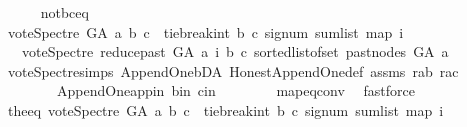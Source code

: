 \begin{isabellebody}
\isanewline
\ \ \ \ \isamarkupfalse%
\ not{\isacharunderscore}{\kern0pt}b{\isacharunderscore}{\kern0pt}c{\isacharunderscore}{\kern0pt}eq\isanewline
\ \ \ \ \isamarkupfalse%
\ \isamarkupfalse%
\ {\isachardoublequoteopen}vote{\isacharunderscore}{\kern0pt}Spectre\ G{\isacharunderscore}{\kern0pt}A\ a\ b\ c\ {\isacharequal}{\kern0pt}\ {\isacharparenleft}{\kern0pt}tie{\isacharunderscore}{\kern0pt}break{\isacharunderscore}{\kern0pt}int\ b\ c\ {\isacharparenleft}{\kern0pt}signum\ {\isacharparenleft}{\kern0pt}sum{\isacharunderscore}{\kern0pt}list\ {\isacharparenleft}{\kern0pt}map\ {\isacharparenleft}{\kern0pt}{\isasymlambda}i{\isachardot}{\kern0pt}\isanewline
\ \ \ {\isacharparenleft}{\kern0pt}vote{\isacharunderscore}{\kern0pt}Spectre\ {\isacharparenleft}{\kern0pt}reduce{\isacharunderscore}{\kern0pt}past\ G{\isacharunderscore}{\kern0pt}A\ a{\isacharparenright}{\kern0pt}\ i\ b\ c{\isacharparenright}{\kern0pt}{\isacharparenright}{\kern0pt}\ {\isacharparenleft}{\kern0pt}sorted{\isacharunderscore}{\kern0pt}list{\isacharunderscore}{\kern0pt}of{\isacharunderscore}{\kern0pt}set\ {\isacharparenleft}{\kern0pt}past{\isacharunderscore}{\kern0pt}nodes\ G{\isacharunderscore}{\kern0pt}A\ a{\isacharparenright}{\kern0pt}{\isacharparenright}{\kern0pt}{\isacharparenright}{\kern0pt}{\isacharparenright}{\kern0pt}{\isacharparenright}{\kern0pt}{\isacharparenright}{\kern0pt}{\isachardoublequoteclose}\isanewline
\ \ \ \ \ \ \isamarkupfalse%
\ vote{\isacharunderscore}{\kern0pt}Spectre{\isachardot}{\kern0pt}simps\ Append{\isacharunderscore}{\kern0pt}One{\isachardot}{\kern0pt}bD{\isacharunderscore}{\kern0pt}A\ Honest{\isacharunderscore}{\kern0pt}Append{\isacharunderscore}{\kern0pt}One{\isacharunderscore}{\kern0pt}def\ assms\ r{\isacharunderscore}{\kern0pt}ab\ r{\isacharunderscore}{\kern0pt}ac\ \isanewline
\ \ \ \ \ \ \ \ Append{\isacharunderscore}{\kern0pt}One{\isachardot}{\kern0pt}app{\isacharunderscore}{\kern0pt}in\ b{\isacharunderscore}{\kern0pt}in\ c{\isacharunderscore}{\kern0pt}in\isanewline
\ \ \ \ \ \ \ \ map{\isacharunderscore}{\kern0pt}eq{\isacharunderscore}{\kern0pt}conv\ \isamarkupfalse%
\ fastforce\ \isanewline
\ \ \ \ \isamarkupfalse%
\ \isamarkupfalse%
\ the{\isacharunderscore}{\kern0pt}eq{\isacharcolon}{\kern0pt}\ {\isachardoublequoteopen}vote{\isacharunderscore}{\kern0pt}Spectre\ G{\isacharunderscore}{\kern0pt}A\ a\ b\ c\ {\isacharequal}{\kern0pt}\ {\isacharparenleft}{\kern0pt}tie{\isacharunderscore}{\kern0pt}break{\isacharunderscore}{\kern0pt}int\ b\ c\ {\isacharparenleft}{\kern0pt}signum\ {\isacharparenleft}{\kern0pt}sum{\isacharunderscore}{\kern0pt}list\ {\isacharparenleft}{\kern0pt}map\ {\isacharparenleft}{\kern0pt}{\isasymlambda}i{\isachardot}{\kern0pt}\isanewline

\end{isabellebody}
